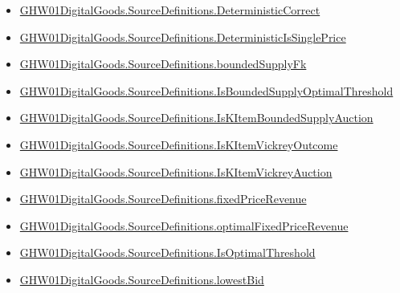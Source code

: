 \documentclass[10pt]{article}
\begin{document}
\begin{itemize}[leftmargin=1.2em]
\begin{itemize}[leftmargin=1.2em]
\item \hyperlink{paper-prerequisite-e2e48f83d07a8dc1}{GHW01\allowbreak{}Digital\allowbreak{}Goods.\allowbreak{}Source\allowbreak{}Definitions.\allowbreak{}Deterministic\allowbreak{}Correct}
\item \hyperlink{paper-prerequisite-18f5ca1078541ee1}{GHW01\allowbreak{}Digital\allowbreak{}Goods.\allowbreak{}Source\allowbreak{}Definitions.\allowbreak{}Deterministic\allowbreak{}Is\allowbreak{}Single\allowbreak{}Price}
\item \hyperlink{paper-prerequisite-2a3fada4f05028c8}{GHW01\allowbreak{}Digital\allowbreak{}Goods.\allowbreak{}Source\allowbreak{}Definitions.\allowbreak{}bounded\allowbreak{}Supply\allowbreak{}Fk}
\item \hyperlink{paper-prerequisite-28efc6f30b31d0f1}{GHW01\allowbreak{}Digital\allowbreak{}Goods.\allowbreak{}Source\allowbreak{}Definitions.\allowbreak{}Is\allowbreak{}Bounded\allowbreak{}Supply\allowbreak{}Optimal\allowbreak{}Threshold}
\item \hyperlink{paper-prerequisite-8a6df798af4cbc37}{GHW01\allowbreak{}Digital\allowbreak{}Goods.\allowbreak{}Source\allowbreak{}Definitions.\allowbreak{}Is\allowbreak{}K\allowbreak{}Item\allowbreak{}Bounded\allowbreak{}Supply\allowbreak{}Auction}
\item \hyperlink{paper-prerequisite-4c657a762617464c}{GHW01\allowbreak{}Digital\allowbreak{}Goods.\allowbreak{}Source\allowbreak{}Definitions.\allowbreak{}Is\allowbreak{}K\allowbreak{}Item\allowbreak{}Vickrey\allowbreak{}Outcome}
\item \hyperlink{paper-prerequisite-dfe7086198eadcdb}{GHW01\allowbreak{}Digital\allowbreak{}Goods.\allowbreak{}Source\allowbreak{}Definitions.\allowbreak{}Is\allowbreak{}K\allowbreak{}Item\allowbreak{}Vickrey\allowbreak{}Auction}
\item \hyperlink{paper-prerequisite-ae58224244d139f8}{GHW01\allowbreak{}Digital\allowbreak{}Goods.\allowbreak{}Source\allowbreak{}Definitions.\allowbreak{}fixed\allowbreak{}Price\allowbreak{}Revenue}
\item \hyperlink{paper-prerequisite-4fcd7524a5594ff6}{GHW01\allowbreak{}Digital\allowbreak{}Goods.\allowbreak{}Source\allowbreak{}Definitions.\allowbreak{}optimal\allowbreak{}Fixed\allowbreak{}Price\allowbreak{}Revenue}
\item \hyperlink{paper-prerequisite-a813863698188454}{GHW01\allowbreak{}Digital\allowbreak{}Goods.\allowbreak{}Source\allowbreak{}Definitions.\allowbreak{}Is\allowbreak{}Optimal\allowbreak{}Threshold}
\item \hyperlink{paper-prerequisite-b3300c5b0b93fbe9}{GHW01\allowbreak{}Digital\allowbreak{}Goods.\allowbreak{}Source\allowbreak{}Definitions.\allowbreak{}lowest\allowbreak{}Bid}

\end{itemize}
\end{itemize}
\end{document}

